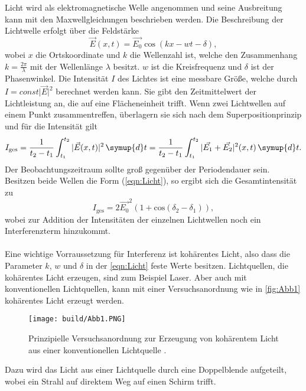 Licht wird als elektromagnetische Welle angenommen und seine Ausbreitung kann mit den Maxwellgleichungen beschrieben werden.
Die Beschreibung der Lichtwelle erfolgt über die Feldstärke
\begin{equation}
    \vec{E}(x,t) = \vec{E_0} \cos(kx-wt-\delta),
    \label{eqn:Licht}
\end{equation}
wobei $x$ die Ortskoordinate und $k$ die Wellenzahl ist, welche den Zusammenhang $k = \frac{2\pi}{\lambda}$ mit der Wellenlänge $\lambda$ besitzt. 
$w$ ist die Kreisfrequenz und $\delta$ ist der Phasenwinkel.
Die Intensität $I$ des Lichtes ist eine messbare Größe, welche durch $I = const \lvert \vec{E} \rvert^2$ berechnet werden kann.
Sie gibt den Zeitmittelwert der Lichtleistung an, die auf eine Flächeneinheit trifft. 
Wenn zwei Lichtwellen auf einem Punkt zusammentreffen, überlagern sie sich nach dem Superpositionprinzip und für die Intensität gilt
\begin{equation*}
    I_{\text{ges}} = \frac{1}{t_2 - t_1} \int_{t_1}^{t_2} | \vec{E}(x,t)|^2 \, \symup{d}t  = \frac{1}{t_2 - t_1} \int_{t_1}^{t_2} | \vec{E_1}+ \vec{E_2}|^2 (x,t) \, \symup{d}t .
\end{equation*}
Der Beobachtungszeitraum sollte groß gegenüber der Periodendauer sein.\\
Besitzen beide Wellen die Form (\ref{eqn:Licht}), so ergibt sich die Gesamtintensität zu 
\begin{equation*}
    I_{\text{ges}} = 2\vec{E_0}^2(1+\text{cos}(\delta_2 - \delta_1)), 
\end{equation*}
wobei zur Addition der Intensitäten der einzelnen Lichtwellen noch ein Interferenzterm hinzukommt.\\
\\
Eine wichtige Vorraussetzung für Interferenz ist kohärentes Licht, also dass die Parameter $k$, $w$ und $\delta$ in der 
\autoref{eqn:Licht} feste Werte besitzen.
Lichtquellen, die kohärentes Licht erzeugen, sind zum Beispiel Laser. 
Aber auch mit konventionellen Lichtquellen, kann mit einer Versuchsanordnung wie in \autoref{fig:Abb1} kohärentes Licht erzeugt werden.
\begin{figure}[H]
    \centering
    \texttt{[image: build/Abb1.PNG]}
    \caption {Prinzipielle Versuchsanordnung zur Erzeugung von kohärentem Licht aus einer konventionellen Lichtquelle \cite[3]{V401}.}
    \label{fig:Abb1}
\end{figure}
Dazu wird das Licht aus einer Lichtquelle durch eine Doppelblende aufgeteilt, wobei ein Strahl auf direktem Weg auf einen Schirm trifft.
